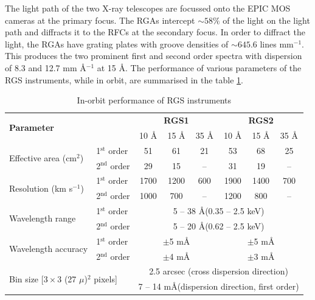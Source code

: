 		The light path of the two X-ray telescopes are focussed onto the EPIC MOS cameras at the primary focus. The RGAs intercept $\sim 58\%$ of the light on the light path and diffracts it to the RFCs at the secondary focus. In order to diffract the light, the RGAs have grating plates with groove densities of $\sim 645.6$ lines mm$^{-1}$. This produces the two prominent first and second order spectra with dispersion of 8.3 and 12.7 mm \AA$^{-1}$ at 15 \AA. The performance of various parameters of the RGS instruments, while in orbit, are summarised in the table \ref{xmm-rgs-performance}.
		
		\begin{table}[h!]
			\centering
			\caption{In-orbit performance of RGS instruments}
			\label{xmm-rgs-performance}
			\begin{tabular}{l|l|ccc|ccc}
				\hline
				\multicolumn{2}{l|}{\multirow{2}{*}{\textbf{Parameter}}} & \multicolumn{3}{c|}{\textbf{RGS1}} & \multicolumn{3}{c}{\textbf{RGS2}} \\ \cline{3-8}
				\multicolumn{2}{l|}{} & {10 \AA} & {15 \AA} & {35 \AA} & {10 \AA} & {15 \AA} & {35 \AA} \\ \hline
				\multirow{2}{*}{Effective area (cm$^2$)} & {1$^\text{st}$ order} & {51} & {61} & {21} & {53} & {68} & {25} \\ %
														 & {2$^\text{nd}$ order} & {29} & {15} & {--} & {31} & {19} & {--} \\ \hline
				\multirow{2}{*}{Resolution (km s$^{-1}$)}& {1$^\text{st}$ order} & {1700} & {1200} & {600} & {1900} & {1400} & {700} \\ %
														 & {2$^\text{nd}$ order} & {1000} & {700} & {--} & {1200} & {800} & {--} \\ \hline
				\multirow{2}{*}{Wavelength range} & {1$^\text{st}$ order} & \multicolumn{6}{c}{5 -- 38 \AA (0.35 -- 2.5 keV)} \\ %
												   & {2$^\text{nd}$ order} & \multicolumn{6}{c}{5 -- 20 \AA (0.62 -- 2.5 keV)} \\ \hline
				\multirow{2}{*}{Wavelength accuracy} & {1$^\text{st}$ order} & \multicolumn{3}{c}{$\pm$5 m\AA} & \multicolumn{3}{c}{$\pm$5 m\AA} \\ %
                                                  	  & {2$^\text{nd}$ order} & \multicolumn{3}{c}{$\pm$4 m\AA} & \multicolumn{3}{c}{$\pm$3 m\AA} \\ \hline
				\multicolumn{2}{l|}{\multirow{2}{*}{Bin size {[}$3\times 3$ (27 $\mu$)$^2$ pixels{]}}} & \multicolumn{6}{c}{2.5 arcsec (cross dispersion direction)} \\ %
				\multicolumn{2}{l|}{} & \multicolumn{6}{c}{7 -- 14 m\AA (dispersion direction, first order)} \\ \hline
			\end{tabular}
		\end{table}
		
